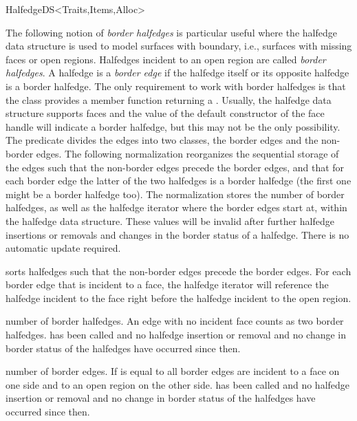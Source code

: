 \begin{ccRefConcept}{HalfedgeDS<Traits,Items,Alloc>}


\begin{ccAdvanced}
\vspace*{-2mm}
  
The following notion of {\em border halfedges\/} is particular useful
where the halfedge data structure is used to model surfaces with
boundary, i.e., surfaces with missing faces or open regions. Halfedges
incident to an open region are called {\em border halfedges}. A
halfedge is a {\em border edge\/} if the halfedge itself or its
opposite halfedge is a border halfedge. The only requirement to work
with border halfedges is that the
 class provides a member function 
returning a . Usually, the halfedge data structure
supports faces and the value of the default constructor of the face
handle will indicate a border halfedge, but this may not be the only
possibility. The  predicate divides the edges into
two classes, the border edges and the non-border edges. The
following normalization reorganizes the sequential storage of the
edges such that the non-border edges precede the border edges, and
that for each border edge the latter of the two halfedges is a
border halfedge (the first one might be a border halfedge too). The
normalization stores the number of border halfedges, as well as the
halfedge iterator where the border edges start at, within the
halfedge data structure.  These values will be invalid after further
halfedge insertions or removals and changes in the border status of 
a halfedge. There is no automatic update required.


    {sorts halfedges such that the non-border edges precede the
     border edges. For each border edge that is incident to a face,
     the halfedge iterator will reference the halfedge incident to the
     face right before the halfedge incident to the open region.}

    {number of border halfedges. An edge with no incident face
      counts as two border halfedges.
    \ccPrecond {} has been called and no
    halfedge insertion or removal and no change in border
    status of the halfedges have occurred since then.}

    {number of border edges. If  is equal
    to  all border edges are incident to
    a face on one side and to an open region on the other side.
    \ccPrecond {} has been called and no
    halfedge insertion or removal and no change in border
    status of the halfedges have occurred since then.}


\end{ccAdvanced}
\end{ccRefConcept}
